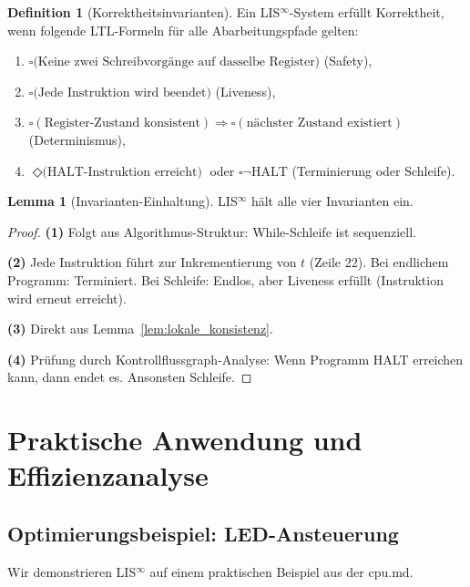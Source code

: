 \documentclass[a4paper,12pt]{article}
\theoremstyle{definition}
\newtheorem{definition}{Definition}
\newtheorem{lemma}{Lemma}
\begin{document}
\begin{definition}[Korrektheitsinvarianten]
	Ein LIS$^{\infty}$-System erfüllt Korrektheit, wenn folgende LTL-Formeln für alle Abarbeitungspfade gelten:
	\begin{enumerate}
		\item $\square \text{(Keine zwei Schreibvorgänge auf dasselbe Register)}$ (Safety),
		\item $\square \text{(Jede Instruktion wird beendet)}$ (Liveness),
		\item $\square (\text{Register-Zustand konsistent}) \Rightarrow \square (\text{nächster Zustand existiert})$ (Determinismus),
		\item $\Diamond \text{(HALT-Instruktion erreicht)}$ oder $\square \neg \text{HALT}$ (Terminierung oder Schleife).
	\end{enumerate}
\end{definition}

\begin{lemma}[Invarianten-Einhaltung]
	LIS$^{\infty}$ hält alle vier Invarianten ein.
\end{lemma}

\begin{proof}
	\textbf{(1)} Folgt aus Algorithmus-Struktur: While-Schleife ist sequenziell.
	
	\textbf{(2)} Jede Instruktion führt zur Inkrementierung von $t$ (Zeile 22). Bei endlichem Programm: Terminiert. Bei Schleife: Endlos, aber Liveness erfüllt (Instruktion wird erneut erreicht).
	
	\textbf{(3)} Direkt aus Lemma~\ref{lem:lokale_konsistenz}.
	
	\textbf{(4)} Prüfung durch Kontrollflussgraph-Analyse: Wenn Programm HALT erreichen kann, dann endet es. Ansonsten Schleife.
\end{proof}

\section{Praktische Anwendung und Effizienzanalyse}

\subsection{Optimierungsbeispiel: LED-Ansteuerung}

Wir demonstrieren LIS$^{\infty}$ auf einem praktischen Beispiel aus der cpu.md.
\end{document}
